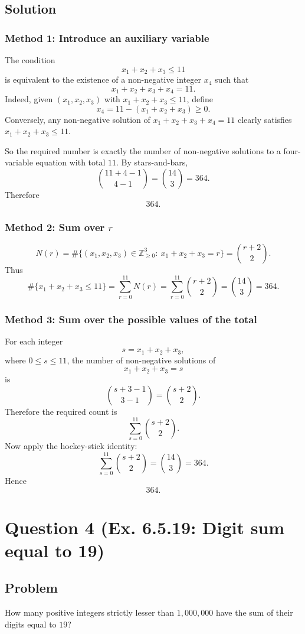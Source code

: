 \documentclass[12pt]{article}
\begin{document}
\subsection{Solution}

\subsubsection{Method 1: Introduce an auxiliary variable}
The condition
\[
x_1+x_2+x_3\le 11
\]
is equivalent to the existence of a non-negative integer $x_4$ such that
\[
x_1+x_2+x_3+x_4=11.
\]
Indeed, given $(x_1,x_2,x_3)$ with $x_1+x_2+x_3\le 11$, define
\[
x_4=11-(x_1+x_2+x_3)\ge 0.
\]
Conversely, any non-negative solution of $x_1+x_2+x_3+x_4=11$ clearly satisfies $x_1+x_2+x_3\le 11$.

So the required number is exactly the number of non-negative solutions to a four-variable equation with total $11$. By stars-and-bars,
\[
\binom{11+4-1}{4-1}=\binom{14}{3}=364.
\]
Therefore
\[
\boxed{364}.
\]
\subsubsection{Method 2: Sum over \(r\)}

\[
N(r)=\#\{(x_1,x_2,x_3)\in\mathbb Z_{\ge0}^3:\ x_1+x_2+x_3=r\}
=\binom{r+2}{2}.
\]
Thus
\[
\#\{x_1+x_2+x_3\le 11\}
=
\sum_{r=0}^{11} N(r)
=
\sum_{r=0}^{11}\binom{r+2}{2}
=
\binom{14}{3}
=
364.
\]

\subsubsection{Method 3: Sum over the possible values of the total}
For each integer
\[
s=x_1+x_2+x_3,
\]
where $0\le s\le 11$, the number of non-negative solutions of
\[
x_1+x_2+x_3=s
\]
is
\[
\binom{s+3-1}{3-1}=\binom{s+2}{2}.
\]
Therefore the required count is
\[
\sum_{s=0}^{11}\binom{s+2}{2}.
\]
Now apply the hockey-stick identity:
\[
\sum_{s=0}^{11}\binom{s+2}{2}=\binom{14}{3}=364.
\]
Hence
\[
\boxed{364}.
\]

\newpage

\section{Question 4 (Ex. 6.5.19: Digit sum equal to 19)}
\subsection{Problem}
How many positive integers strictly lesser than $1{,}000{,}000$ have the sum of their digits equal to $19$?
\end{document}
